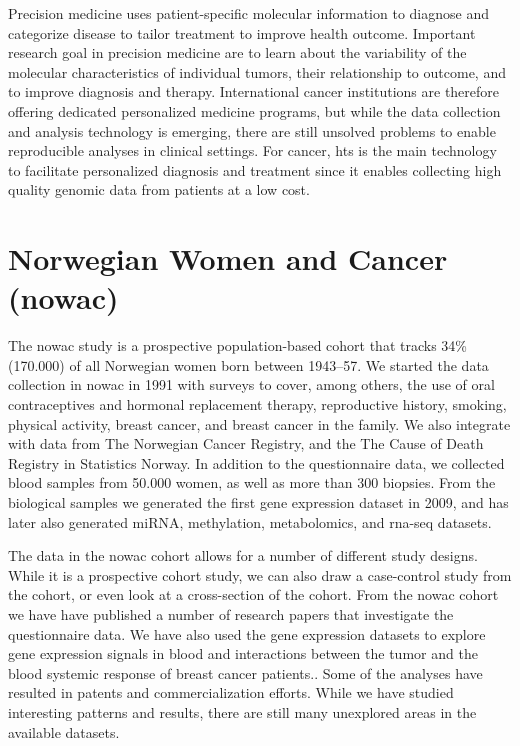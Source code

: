 Precision medicine uses patient-specific molecular information to diagnose and
categorize disease to tailor treatment to improve health
outcome.\cite{national2011toward} Important research goal in precision medicine
are to learn about the variability of the molecular characteristics of
individual tumors, their relationship to outcome, and to improve diagnosis and
therapy.\cite{tannock2016limits} International cancer institutions are therefore
offering dedicated personalized medicine programs, but while the data collection
and analysis technology is emerging, there are still unsolved problems to enable
reproducible analyses in clinical settings. For cancer, \gls{hts}
is the main technology to facilitate personalized diagnosis and
treatment since it enables collecting high quality genomic data from patients
at a low cost. 

\section{Norwegian Women and Cancer (\gls{nowac})} 
The \gls{nowac} study is a prospective population-based cohort that tracks 34\%
(170.000) of all Norwegian women born between 1943–57.\cite{lund2007cohort} We
started the data collection in \gls{nowac} in 1991 with surveys to cover,
among others, the use of oral contraceptives and hormonal replacement therapy,
reproductive history, smoking, physical activity, breast cancer, and breast
cancer in the family. We also integrate with data from The Norwegian Cancer
Registry, and the The Cause of Death Registry in Statistics Norway. In addition
to the questionnaire data, we collected blood samples from 50.000 women, as well
as more than 300 biopsies. From the biological samples we generated the first
gene expression dataset in 2009, and has later also generated miRNA,
methylation, metabolomics, and \gls{rna}-seq datasets. 

The data in the \gls{nowac} cohort allows for a number of different study
designs. While it is a prospective cohort study, we can also draw a case-control
study from the cohort, or even look at a cross-section of the cohort.  From the
\gls{nowac} cohort we have have published a number of research papers that
investigate the questionnaire data\cite{find-some-papers}. We have also used the
gene expression datasets to explore gene expression signals in blood and
interactions between the tumor and the blood systemic response of breast cancer
patients.\cite{holden2017local, dumeaux2017interactions}. Some of the analyses
have resulted in patents\cite{blobrec} and commercialization efforts.  While we have
studied interesting patterns and results, there are still many unexplored areas
in the available datasets.

